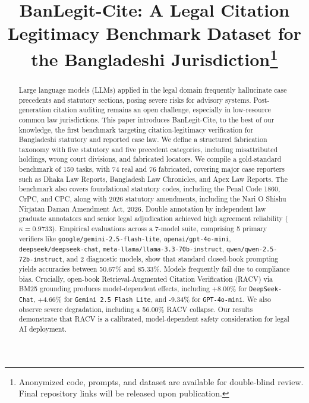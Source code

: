 \documentclass[conference]{IEEEtran}
\begin{document}
\title{BanLegit-Cite: A Legal Citation Legitimacy Benchmark Dataset for the Bangladeshi Jurisdiction\thanks{Anonymized code, prompts, and dataset are available for double-blind review. Final repository links will be released upon publication.}}

\author{
}

\maketitle
\thispagestyle{empty}
\pagestyle{empty}

\begin{abstract}
Large language models (LLMs) applied in the legal domain frequently hallucinate case precedents and statutory sections, posing severe risks for advisory systems. Post-generation citation auditing remains an open challenge, especially in low-resource common law jurisdictions. This paper introduces BanLegit-Cite, to the best of our knowledge, the first benchmark targeting citation-legitimacy verification for Bangladeshi statutory and reported case law. We define a structured fabrication taxonomy with five statutory and five precedent categories, including misattributed holdings, wrong court divisions, and fabricated locators. We compile a gold-standard benchmark of 150 tasks, with 74 real and 76 fabricated, covering major case reporters such as Dhaka Law Reports, Bangladesh Law Chronicles, and Apex Law Reports. The benchmark also covers foundational statutory codes, including the Penal Code 1860, CrPC, and CPC, along with 2026 statutory amendments, including the Nari O Shishu Nirjatan Daman Amendment Act, 2026. Double annotation by independent law graduate annotators and senior legal adjudication achieved high agreement reliability ($\kappa = 0.9733$). Empirical evaluations across a 7-model suite, comprising 5 primary verifiers like \texttt{google/gemini-2.5-flash-lite}, \texttt{openai/gpt-4o-mini}, \texttt{deepseek/deepseek-chat}, \texttt{meta-llama/llama-3.3-70b-instruct}, \texttt{qwen/qwen-2.5-72b-instruct}, and 2 diagnostic models, show that standard closed-book prompting yields accuracies between 50.67\% and 85.33\%. Models frequently fail due to compliance bias. Crucially, open-book Retrieval-Augmented Citation Verification (RACV) via BM25 grounding produces model-dependent effects, including +8.00\% for \texttt{DeepSeek-Chat}, +4.66\% for \texttt{Gemini 2.5 Flash Lite}, and -9.34\% for \texttt{GPT-4o-mini}. We also observe severe degradation, including a 56.00\% RACV collapse. Our results demonstrate that RACV is a calibrated, model-dependent safety consideration for legal AI deployment.
\end{abstract}
\end{document}
